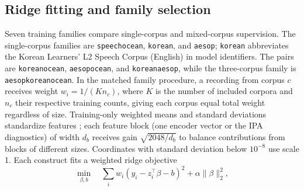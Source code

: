 \documentclass[cameraready]{Interspeech}
\begin{document}
\subsection{Ridge fitting and family selection}
Seven training families compare single-corpus and mixed-corpus supervision. The single-corpus families are \texttt{speechocean}, \texttt{korean}, and \texttt{aesop}; \texttt{korean} abbreviates the Korean Learners' L2 Speech Corpus (English) in model identifiers. The pairs are \texttt{koreanocean}, \texttt{aesopocean}, and \texttt{koreanaesop}, while the three-corpus family is \texttt{aesopkoreanocean}. In the matched family procedure, a recording from corpus $c$ receives weight $w_i=1/(K n_c)$, where $K$ is the number of included corpora and $n_c$ their respective training counts, giving each corpus equal total weight regardless of size. Training-only weighted means and standard deviations standardize features \cite{esl}; each feature block (one encoder vector or the IPA diagnostics) of width $d_b$ receives gain $\sqrt{2048/d_b}$ to balance contributions from blocks of different sizes. Coordinates with standard deviation below $10^{-8}$ use scale 1. Each construct fits a weighted ridge objective \cite{ridge,esl}
\begin{equation}
\min_{\beta,b}\quad\sum_i w_i(y_i-z_i^\top\beta-b)^2+\alpha\lVert\beta\rVert_2^2,
\end{equation}
\end{document}
